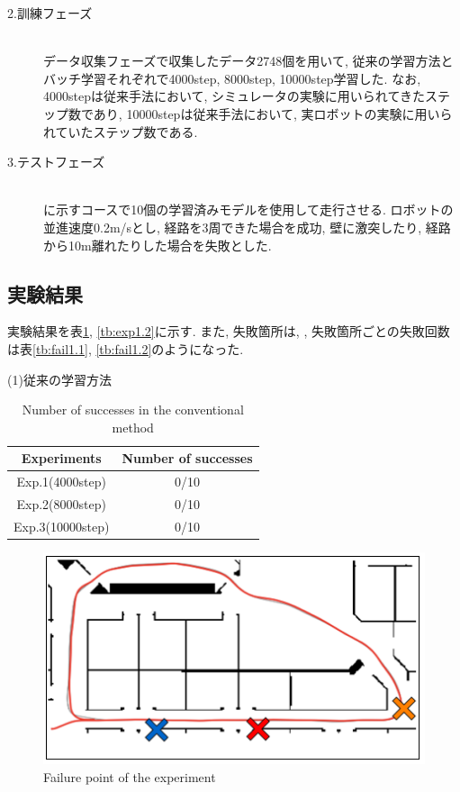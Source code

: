 \newpage
\begin{description}
  \item[2.訓練フェーズ]\mbox{}\\データ収集フェーズで収集したデータ2748個を用いて, 従来の学習方法とバッチ学習それぞれで4000step, 8000step, 10000step学習した. なお, 4000stepは従来手法において, シミュレータの実験に用いられてきたステップ数であり, 10000stepは従来手法において, 実ロボットの実験に用いられていたステップ数である. 
\end{description}

\begin{description}
  \item[3.テストフェーズ]\mbox{}\\ に示すコースで10個の学習済みモデルを使用して走行させる. ロボットの並進速度0.2m/sとし, 経路を3周できた場合を成功, 壁に激突したり, 経路から10m離れたりした場合を失敗とした.
\end{description}

\subsection{実験結果}
実験結果を表\ref{tb:exp1.1}, \ref{tb:exp1.2}に示す. また, 失敗箇所は, , 失敗箇所ごとの失敗回数は表\ref{tb:fail1.1}, \ref{tb:fail1.2}のようになった. 

\newpage
\begin{description}
  \item [(1)従来の学習方法]
\end{description}

\begin{table}[h]
  \centering
  \begin{tabular}{|c|c|} \hline
    Experiments & Number of successes \\ \hline
    Exp.1(4000step) & 0/10 \\ \hline
    Exp.2(8000step) & 0/10 \\ \hline
    Exp.3(10000step) & 0/10 \\ \hline
  \end{tabular}
  \caption{Number of successes in the conventional method}
  \label{tb:exp1.1}
\end{table}

\begin{figure}[h]
  \centering
  \includegraphics[keepaspectratio, scale=0.5]{images/result1.png}
  \caption{Failure point of the experiment}
  \label{Fig:result1.1}
  \end{figure}

